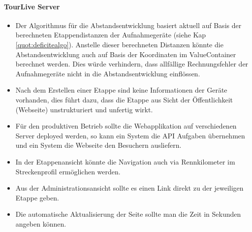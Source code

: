 \paragraph{TourLive Server}
\begin{itemize}
 \item Der Algorithmus für die Abstandsentwicklung basiert aktuell auf Basis der berechneten Etappendistanzen der Aufnahmegeräte (siehe Kap \ref{quot:deficitealgo}). Anstelle dieser berechneten Distanzen könnte die Abstandsentwicklung auch auf Basis der Koordinaten im ValueContainer berechnet werden. Dies würde verhindern, dass allfällige Rechnungsfehler der Aufnahmegeräte nicht in die Abstandsentwicklung einflössen.
 \item Nach dem Erstellen einer Etappe sind keine Informationen der Geräte vorhanden, dies führt dazu, dass die Etappe aus Sicht der Öffentlichkeit (Webseite) unstrukturiert und unfertig wirkt.
 \item Für den produktiven Betrieb sollte die Webapplikation auf verschiedenen Server deployed werden, so kann ein System die API Aufgaben übernehmen und ein System die Webseite den Besuchern ausliefern.
 \item In der Etappenansicht könnte die Navigation auch via Rennkilometer im Streckenprofil ermöglichen werden.
 \item Aus der Administrationsansicht sollte es einen Link direkt zu der jeweiligen Etappe geben.
 \item Die automatische Aktualisierung der Seite sollte man die Zeit in Sekunden angeben können.
\end{itemize}

